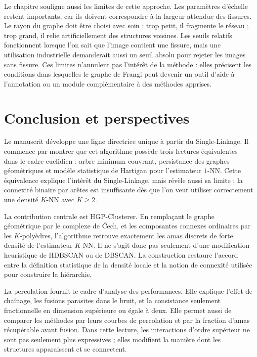Le chapitre souligne aussi les limites de cette approche. Les paramètres d'échelle restent importants, car ils doivent correspondre à la largeur attendue des fissures. Le rayon du graphe doit être choisi avec soin : trop petit, il fragmente le réseau ; trop grand, il relie artificiellement des structures voisines. Les seuils relatifs fonctionnent lorsque l'on sait que l'image contient une fissure, mais une utilisation industrielle demanderait aussi un seuil absolu pour rejeter les images sans fissure. Ces limites n'annulent pas l'intérêt de la méthode : elles précisent les conditions dans lesquelles le graphe de Frangi peut devenir un outil d'aide à l'annotation ou un module complémentaire à des méthodes apprises.

\section*{Conclusion et perspectives}

Le manuscrit développe une ligne directrice unique à partir du Single-Linkage. Il commence par montrer que cet algorithme possède trois lectures équivalentes dans le cadre euclidien : arbre minimum couvrant, persistance des graphes géométriques et modèle statistique de Hartigan pour l'estimateur $1$-NN. Cette équivalence explique l'intérêt du Single-Linkage, mais révèle aussi sa limite : la connexité binaire par arêtes est insuffisante dès que l'on veut utiliser correctement une densité $K$-NN avec $K\geq 2$.

La contribution centrale est HGP-Clusterer. En remplaçant le graphe géométrique par le complexe de \v{C}ech, et les composantes connexes ordinaires par les $K$-polyèdres, l'algorithme retrouve exactement les amas discrets de forte densité de l'estimateur $K$-NN. Il ne s'agit donc pas seulement d'une modification heuristique de HDBSCAN ou de DBSCAN. La construction restaure l'accord entre la définition statistique de la densité locale et la notion de connexité utilisée pour construire la hiérarchie.

La percolation fournit le cadre d'analyse des performances. Elle explique l'effet de chaînage, les fusions parasites dans le bruit, et la consistance seulement fractionnelle en dimension supérieure ou égale à deux. Elle permet aussi de comparer les méthodes par leurs courbes de percolation et par la fraction d'amas récupérable avant fusion. Dans cette lecture, les interactions d'ordre supérieur ne sont pas seulement plus expressives ; elles modifient la manière dont les structures apparaissent et se connectent.


